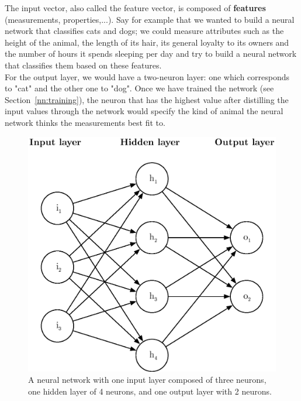 The input vector, also called the feature vector, 
is composed of \textbf{features} (measurements, properties,...). Say
for example that we wanted to build a neural network that classifies cats and
dogs; we could measure attributes such as the height of the animal, the length
of its hair, its general loyalty to its owners and the number of hours it 
spends sleeping per day and try to build a neural network that classifies
them based on these features.\\

For the output layer, we would have a two-neuron layer: one which corresponds
to "cat" and the other one to "dog". Once we have trained the network
(see Section~\ref{nn:training}), the neuron that has the highest value
after distilling the input values through the network would specify the
kind of animal the neural network thinks the measurements best fit to.\\

\begin{figure}[]
	\centering
	\includegraphics[width=0.6\linewidth]{fig/neural_network.eps}
	\caption{A neural network with one input layer composed of three neurons,
	one hidden layer of 4 neurons, and one output layer with 2 neurons.}
	\label{fig:neural_network}
\end{figure}


